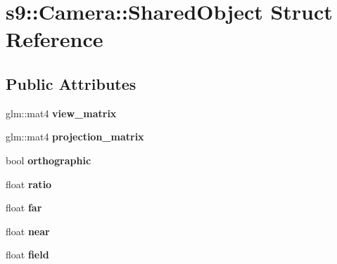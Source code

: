 \hypertarget{structs9_1_1Camera_1_1SharedObject}{\section{s9\-:\-:Camera\-:\-:Shared\-Object Struct Reference}
\label{structs9_1_1Camera_1_1SharedObject}
}
\subsection*{Public Attributes}
\begin{DoxyCompactItemize}
\item 
\hypertarget{structs9_1_1Camera_1_1SharedObject_a0498d451b83b7bf8e1e33d75a9a0c3a3}{glm\-::mat4 {\bfseries view\-\_\-matrix}}\label{structs9_1_1Camera_1_1SharedObject_a0498d451b83b7bf8e1e33d75a9a0c3a3}

\item 
\hypertarget{structs9_1_1Camera_1_1SharedObject_ad2706ddd0aff135dfdc992a436bd3d66}{glm\-::mat4 {\bfseries projection\-\_\-matrix}}\label{structs9_1_1Camera_1_1SharedObject_ad2706ddd0aff135dfdc992a436bd3d66}

\item 
\hypertarget{structs9_1_1Camera_1_1SharedObject_a031cbb7afc6db11d15ae2dfd46a2d328}{bool {\bfseries orthographic}}\label{structs9_1_1Camera_1_1SharedObject_a031cbb7afc6db11d15ae2dfd46a2d328}

\item 
\hypertarget{structs9_1_1Camera_1_1SharedObject_a16c49e3fa64d82537199f76b04b0e081}{float {\bfseries ratio}}\label{structs9_1_1Camera_1_1SharedObject_a16c49e3fa64d82537199f76b04b0e081}

\item 
\hypertarget{structs9_1_1Camera_1_1SharedObject_a2bad66ef28f5a8f31871f4aa88e4da73}{float {\bfseries far}}\label{structs9_1_1Camera_1_1SharedObject_a2bad66ef28f5a8f31871f4aa88e4da73}

\item 
\hypertarget{structs9_1_1Camera_1_1SharedObject_a1fb5803084211e14731e8f592fd8ceb4}{float {\bfseries near}}\label{structs9_1_1Camera_1_1SharedObject_a1fb5803084211e14731e8f592fd8ceb4}

\item 
\hypertarget{structs9_1_1Camera_1_1SharedObject_af3a929384e4e6f4da3221f97d0884cad}{float {\bfseries field}}\label{structs9_1_1Camera_1_1SharedObject_af3a929384e4e6f4da3221f97d0884cad}


\end{DoxyCompactItemize}
